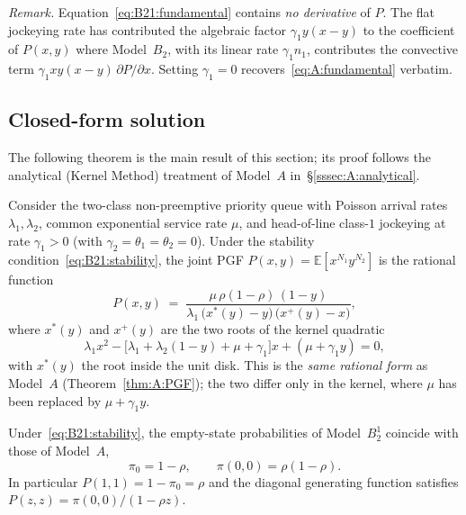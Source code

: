 \noindent\textit{Remark.}
Equation~\eqref{eq:B21:fundamental} contains \emph{no derivative} of $P$. The flat
jockeying rate has contributed the algebraic factor $\gamma_1 y(x-y)$ to the coefficient of
$P(x,y)$ where Model~$B_2$, with its linear rate $\gamma_1 n_1$, contributes the
convective term $\gamma_1 xy(x-y)\,\partial P/\partial x$. Setting $\gamma_1=0$
recovers~\eqref{eq:A:fundamental} verbatim.

\subsection{Closed-form solution}

The following theorem is the main result of this section; its proof follows the
analytical (Kernel Method) treatment of Model~$A$ in~\S\ref{sssec:A:analytical}.

\begin{theorem}\label{thm:B21:PGF}
Consider the two-class non-preemptive priority queue with Poisson arrival rates
$\lambda_1,\lambda_2$, common exponential service rate $\mu$, and head-of-line class-$1$
jockeying at rate $\gamma_1>0$ (with $\gamma_2=\theta_1=\theta_2=0$). Under the stability
condition~\eqref{eq:B21:stability}, the joint PGF $P(x,y)=\mathbb{E}[x^{N_1}y^{N_2}]$ is
the rational function
\begin{equation}
    P(x,y) \;=\; \frac{\mu\,\rho(1-\rho)\,(1-y)}
    {\lambda_1\,\bigl(x^*(y)-y\bigr)\,\bigl(x^+(y)-x\bigr)},
    \label{eq:B21:PGF}
\end{equation}
where $x^*(y)$ and $x^+(y)$ are the two roots of the kernel quadratic
\begin{equation}
    \lambda_1 x^2 - \bigl[\lambda_1+\lambda_2(1-y)+\mu+\gamma_1\bigr]x + (\mu+\gamma_1 y) = 0,
    \label{eq:B21:quad}
\end{equation}
with $x^*(y)$ the root inside the unit disk. This is the \emph{same rational form} as
Model~$A$ (Theorem~\ref{thm:A:PGF}); the two differ only in the kernel, where $\mu$ has been
replaced by $\mu+\gamma_1 y$.
\end{theorem}

\begin{corollary}\label{cor:B21:pi0}
Under~\eqref{eq:B21:stability}, the empty-state probabilities of Model~$B_2^1$ coincide with
those of Model~$A$,
\begin{equation}
    \pi_0 = 1-\rho, \qquad \pi(0,0) = \rho(1-\rho).
    \label{eq:B21:pi0_pi00}
\end{equation}
In particular $P(1,1)=1-\pi_0=\rho$ and the diagonal generating function satisfies
$P(z,z)=\pi(0,0)/(1-\rho z)$.
\end{corollary}

